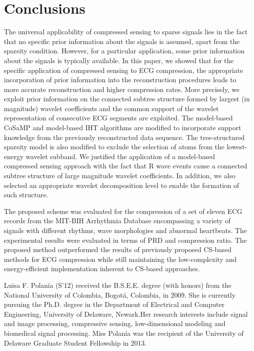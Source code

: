 \documentclass[journal]{IEEEtran}
\begin{document}
\section{Conclusions}
The universal applicability of compressed sensing to sparse signals lies in the fact that no specific prior information about the signals is assumed, apart from the sparsity condition. However, for a particular application, some prior information about the signals is typically available. In this paper, we showed that for the specific application of compressed sensing to ECG compression, the appropriate incorporation of prior information into the reconstruction procedures leads to more accurate reconstruction and higher compression rates. More precisely, we exploit prior information on the connected subtree structure formed by largest (in magnitude) wavelet coefficients and the common support of the wavelet representation of consecutive ECG segments are exploited. The model-based CoSaMP and model-based IHT algorithms are modified to incorporate support knowledge from the previously reconstructed data sequence. The tree-structured sparsity model is also modified to exclude the selection of atoms from the lowest-energy wavelet subband. We justified the application of a model-based compressed sensing approach with the fact that R wave events cause a connected subtree structure of large magnitude wavelet coefficients. In addition, we also selected an appropriate wavelet decomposition level to enable the formation of such structure.

The proposed scheme was evaluated for the compression of a set of eleven ECG records from the MIT-BIH Arrhythmia Database encompassing a variety of signals with different rhythms, wave morphologies and abnormal heartbeats. The experimental results were evaluated in terms of PRD and compression ratio. The proposed method outperformed the results of previously proposed CS-based methods for ECG compression while still maintaining the low-complexity and energy-efficient implementation inherent to CS-based approaches.









\begin{IEEEbiography}{Luisa F. Polan\'{i}a}
(S'12) received the B.S.E.E. degree (with honors) from the National University of Colombia, Bogot\'{a}, Colombia, in 2009. She is currently pursuing the Ph.D. degree in the Department of Electrical and Computer Engineering, University of Delaware, Newark.Her research interests include signal and image processing, compressive sensing, low-dimensional modeling and biomedical signal processing. Miss Polan\'{i}a was the recipient of the University
of Delaware Graduate Student Fellowship in 2013.
\end{IEEEbiography}
\end{document}
